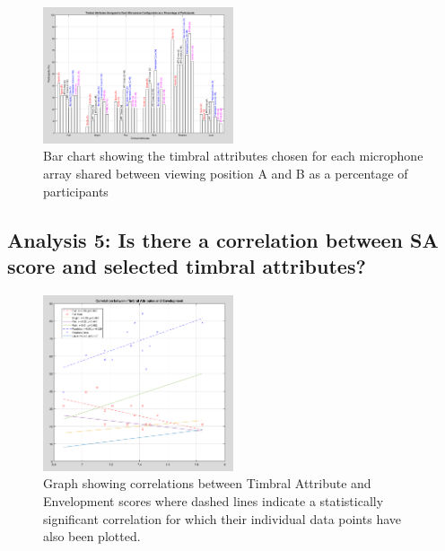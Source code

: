 \documentclass{aes2e}
\begin{document}
		
		\begin{figure}
			\includegraphics[width=0.5\textwidth]{images/plots/bar_sharedMics.PNG}
			\caption{Bar chart showing the timbral attributes chosen for each microphone array shared between viewing position A and B as a percentage of participants}
			\label{image:ta_sharedmics} 
		\end{figure}		


	\subsection{Analysis 5: Is there a correlation between SA score and selected timbral attributes?}



		\begin{figure}
			\includegraphics[width=0.5\textwidth]{images/plots/sa_ta_corr_env.PNG}
			\caption{Graph showing correlations between Timbral Attribute and Envelopment scores where dashed lines indicate a statistically significant correlation for which their individual data points have also been plotted.}
			\label{image:corr_env} 
		\end{figure}		



\end{document}

